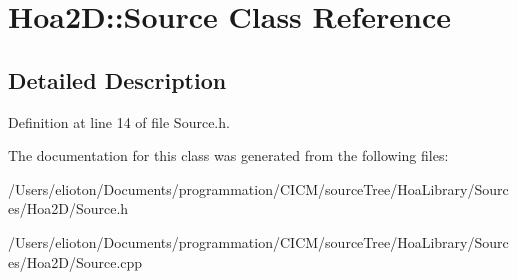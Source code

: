 \hypertarget{class_hoa2_d_1_1_source}{\section{Hoa2\-D\-:\-:Source Class Reference}
\label{class_hoa2_d_1_1_source}
}


\subsection{Detailed Description}


Definition at line 14 of file Source.\-h.



The documentation for this class was generated from the following files\-:\begin{DoxyCompactItemize}
\item 
/\-Users/elioton/\-Documents/programmation/\-C\-I\-C\-M/source\-Tree/\-Hoa\-Library/\-Sources/\-Hoa2\-D/Source.\-h\item 
/\-Users/elioton/\-Documents/programmation/\-C\-I\-C\-M/source\-Tree/\-Hoa\-Library/\-Sources/\-Hoa2\-D/Source.\-cpp\end{DoxyCompactItemize}

